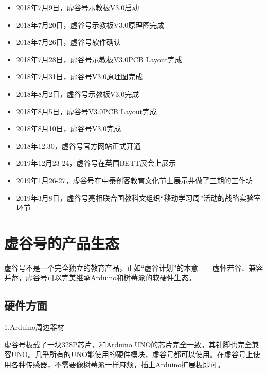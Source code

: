 \documentclass[letterpaper,10pt,english]{sphinxmanual}
\begin{document}
\begin{itemize}
\item {} 
2018年7月9日，虚谷号示教板V3.0启动

\item {} 
2018年7月20日，虚谷号示教板V3.0原理图完成

\item {} 
2018年7月26日，虚谷号软件确认

\item {} 
2018年7月28日，虚谷号示教板V3.0PCB Layout完成

\item {} 
2018年7月31日，虚谷号V3.0原理图完成

\item {} 
2018年8月2日，虚谷号示教板V3.0完成

\item {} 
2018年8月5日，虚谷号V3.0PCB Layout完成

\item {} 
2018年8月10日，虚谷号V3.0完成

\item {} 
2018年12.30，虚谷号官方网站正式开通

\item {} 
2019年12月23-24，虚谷号在英国BETT展会上展示

\item {} 
2019年1月26-27，虚谷号在中泰创客教育文化节上展示并做了三期的工作坊

\item {} 
2019年3月8日，虚谷号亮相联合国教科文组织“移动学习周”活动的战略实验室环节

\end{itemize}


\section{虚谷号的产品生态}
\label{\detokenize{01.about/1.4-ecology:id1}}\label{\detokenize{01.about/1.4-ecology::doc}}
虚谷号不是一个完全独立的教育产品，正如“虚谷计划”的本意——虚怀若谷、兼容并蓄，虚谷号可以完美继承Arduino和树莓派的软硬件生态。


\subsection{硬件方面}
\label{\detokenize{01.about/1.4-ecology:id2}}
1.Arduino周边器材

虚谷号板载了一块328P芯片，和Arduino UNO的芯片完全一致。其针脚也完全兼容UNO。几乎所有的UNO能使用的硬件模块，虚谷号都可以使用。在虚谷号上使用各种传感器，不需要像树莓派一样麻烦，插上Arduino扩展板即可。
\end{document}
